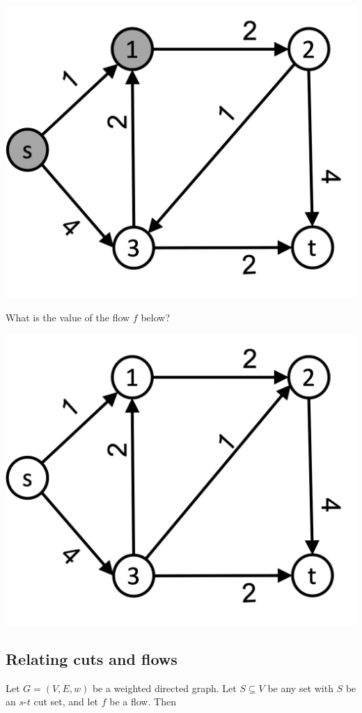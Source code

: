 \documentclass[11  pt]{article}
\begin{document}
	\begin{center}
		\includegraphics[width = .5\linewidth]{cut1.png} \\
	\end{center}
	
		\begin{Qu}
		What is the value of the flow $f$ below? 
		\begin{center}
			\includegraphics[width = .5\linewidth]{flow2.png} \\
		\end{center}
		\begin{itemize}
		\end{itemize}
	\end{Qu}
	
	\newpage
	
	\subsection{Relating cuts and flows}
	
	
	\begin{lemma}
		Let $G = (V,E,w)$ be a weighted directed graph. Let $S \subseteq V$ be any set with $S$ be an $s$-$t$ cut set, and let $f$ be a flow. Then

	\end{lemma}
	
	
	\newpage
	
\end{document}

